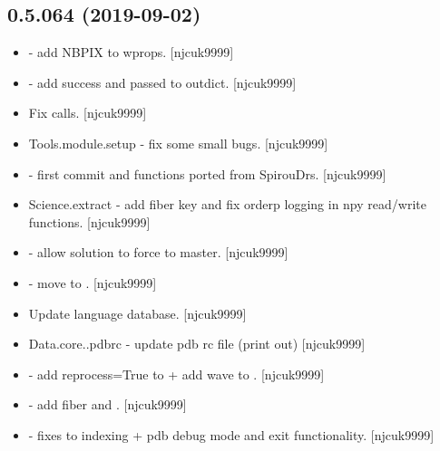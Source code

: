 \documentclass[a4paper,10pt,english]{report}
\begin{document}
\subsection{0.5.064 (2019-09-02)}
\label{\detokenize{misc/changelog:id79}}\begin{itemize}
\item {} 
 - add NBPIX to wprops. {[}njcuk9999{]}

\item {} 
 - add success and passed to outdict.
{[}njcuk9999{]}

\item {} 
Fix  calls. {[}njcuk9999{]}

\item {} 
Tools.module.setup - fix some small bugs. {[}njcuk9999{]}

\item {} 
 - first commit and functions ported from SpirouDrs.
{[}njcuk9999{]}

\item {} 
Science.extract - add fiber key and fix orderp logging in npy
read/write functions. {[}njcuk9999{]}

\item {} 
 - allow  solution to force to
master. {[}njcuk9999{]}

\item {} 
 - move  to .
{[}njcuk9999{]}

\item {} 
Update language database. {[}njcuk9999{]}

\item {} 
Data.core..pdbrc - update pdb rc file (print out) {[}njcuk9999{]}

\item {} 
 - add reprocess=True to  + add
wave to . {[}njcuk9999{]}

\item {} 
 - add fiber and .
{[}njcuk9999{]}

\item {} 
 - fixes to indexing + pdb debug mode and exit
functionality. {[}njcuk9999{]}


\end{itemize}
\end{document}
